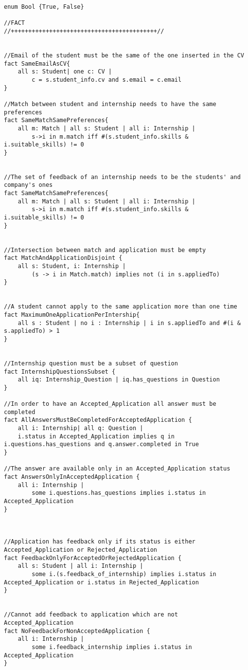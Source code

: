 \begin{lstlisting}
enum Bool {True, False}

//FACT
//++++++++++++++++++++++++++++++++++++++++++//


//Email of the student must be the same of the one inserted in the CV
fact SameEmailAsCV{
	all s: Student| one c: CV |
		c = s.student_info.cv and s.email = c.email
}

//Match between student and internship needs to have the same preferences
fact SameMatchSamePreferences{
	all m: Match | all s: Student | all i: Internship |
		s->i in m.match iff #(s.student_info.skills & i.suitable_skills) != 0
}


//The set of feedback of an internship needs to be the students' and company's ones
fact SameMatchSamePreferences{
	all m: Match | all s: Student | all i: Internship |
		s->i in m.match iff #(s.student_info.skills & i.suitable_skills) != 0
}


//Intersection between match and application must be empty
fact MatchAndApplicationDisjoint {
    all s: Student, i: Internship |
        (s -> i in Match.match) implies not (i in s.appliedTo)
}


//A student cannot apply to the same application more than one time
fact MaximumOneApplicationPerIntership{
	all s : Student | no i : Internship | i in s.appliedTo and #(i & s.appliedTo) > 1
}


//Internship question must be a subset of question
fact InternshipQuestionsSubset {
    all iq: Internship_Question | iq.has_questions in Question
}

//In order to have an Accepted_Application all answer must be completed
fact AllAnswersMustBeCompletedForAcceptedApplication {
	all i: Internship| all q: Question |
	i.status in Accepted_Application implies q in i.questions.has_questions and q.answer.completed in True
}

//The answer are available only in an Accepted_Application status
fact AnswersOnlyInAcceptedApplication {
    all i: Internship | 
        some i.questions.has_questions implies i.status in Accepted_Application
}



//Application has feedback only if its status is either Accepted_Application or Rejected_Application
fact FeedbackOnlyForAcceptedOrRejectedApplication {
    all s: Student | all i: Internship |
        some i.(s.feedback_of_internship) implies i.status in Accepted_Application or i.status in Rejected_Application
}


//Cannot add feedback to application which are not Accepted_Application
fact NoFeedbackForNonAcceptedApplication {
    all i: Internship |
        some i.feedback_internship implies i.status in Accepted_Application
}


\end{lstlisting}
